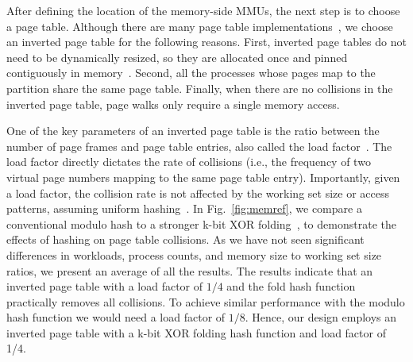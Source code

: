 After defining the location of the memory-side MMUs, the next step is to choose a page table. Although there are many page table implementations~\cite{yaniv:hash}, we choose an inverted page table for the following reasons. First, inverted page tables do not need to be dynamically resized, so they are allocated once and pinned contiguously in memory~\cite{jacob:look}. Second, all the processes whose pages map to the partition share the same page table. Finally, when there are no collisions in the inverted page table, page walks only require a single memory access.

One of the key parameters of an inverted page table is the ratio between the number of page frames and page table entries, also called the load factor~\cite{cormen:introduction}. The load factor directly dictates the rate of collisions (i.e., the frequency of two virtual page numbers mapping to the same page table entry). Importantly, given a load factor, the collision rate is not affected by the working set size or access patterns, assuming uniform hashing~\cite{cormen:introduction}. In Fig.~\ref{fig:memref}, we compare a conventional modulo hash to a stronger k-bit XOR folding~\cite{qureshi:fundamental}, to demonstrate the effects of hashing on page table collisions. As we have not seen significant differences in workloads, process counts, and memory size to working set size ratios, we present an average of all the results. The results indicate that an inverted page table with a load factor of $1/4$ and the fold hash function practically removes all collisions. To achieve similar performance with the modulo hash function we would need a load factor of $1/8$. Hence, our design employs an inverted page table with a k-bit XOR folding hash function and load factor of 1/4.  

